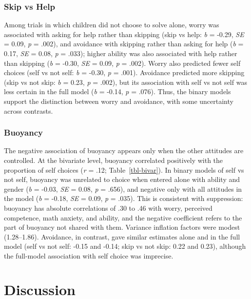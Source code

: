 \documentclass[
  man,
  floatsintext,
  longtable,
  nolmodern,
  notxfonts,
  notimes,
  colorlinks=true,linkcolor=blue,citecolor=blue,urlcolor=blue]{apa7}
\begin{document}
\subsubsection{Skip vs Help}\label{skip-vs-help}

Among trials in which children did not choose to solve alone, worry was
associated with asking for help rather than skipping (skip vs help:
\emph{b} = -0.29, \emph{SE} = 0.09, \emph{p} = .002), and avoidance with
skipping rather than asking for help (\emph{b} = 0.17, \emph{SE} = 0.08,
\emph{p} = .033); higher ability was also associated with help rather
than skipping (\emph{b} = -0.30, \emph{SE} = 0.09, \emph{p} = .002).
Worry also predicted fewer self choices (self vs not self: \emph{b} =
-0.30, \emph{p} = .001). Avoidance predicted more skipping (skip vs not
skip: \emph{b} = 0.23, \emph{p} = .002), but its association with self
vs not self was less certain in the full model (\emph{b} = -0.14,
\emph{p} = .076). Thus, the binary models support the distinction
between worry and avoidance, with some uncertainty across contrasts.

\subsubsection{Buoyancy}\label{buoyancy}

The negative association of buoyancy appears only when the other
attitudes are controlled. At the bivariate level, buoyancy correlated
positively with the proportion of self choices (\emph{r} = .12;
Table~\ref{tbl-bivar}). In binary models of self vs not self, buoyancy
was unrelated to choice when entered alone with ability and gender
(\emph{b} = -0.03, \emph{SE} = 0.08, \emph{p} = .656), and negative only
with all attitudes in the model (\emph{b} = -0.18, \emph{SE} = 0.09,
\emph{p} = .035). This is consistent with suppression: buoyancy has
absolute correlations of .30 to .46 with worry, perceived competence,
math anxiety, and ability, and the negative coefficient refers to the
part of buoyancy not shared with them. Variance inflation factors were
modest (1.28--1.86). Avoidance, in contrast, gave similar estimates
alone and in the full model (self vs not self: -0.15 and -0.14; skip vs
not skip: 0.22 and 0.23), although the full-model association with self
choice was imprecise.

\section{Discussion}\label{discussion}
\end{document}
